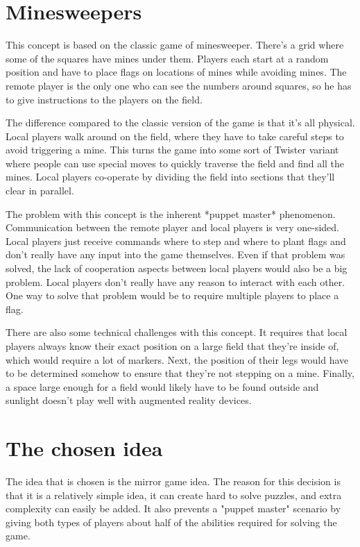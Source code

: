 \section{Minesweepers}
	This concept is based on the classic game of minesweeper. There's a grid
	where some of the squares have mines under them. Players each start at a
	random position and have to place flags on locations of mines while avoiding
	mines. The remote player is the only one who can see the numbers around
	squares, so he has to give instructions to the players on the field.

	The difference compared to the classic version of the game is that it's all
	physical. Local players walk around on the field, where they have to take
	careful steps to avoid triggering a mine. This turns the game into some sort
	of Twister variant where people can use special moves to quickly traverse
	the field and find all the mines. Local players co-operate by dividing the
	field into sections that they'll clear in parallel.

	The problem with this concept is the inherent *puppet master* phenomenon.
	Communication between the remote player and local players is very one-sided.
	Local players just receive commands where to step and where to plant flags
	and don't really have any input into the game themselves. Even if that
	problem was solved, the lack of cooperation aspects between local players
	would also be a big problem. Local players don't really have any reason to
	interact with each other. One way to solve that problem would be to require
	multiple players to place a flag.

	There are also some technical challenges with this concept. It requires that
	local players always know their exact position on a large field that they're
	inside of, which would require a lot of markers. Next, the position of their
	legs would have to be determined somehow to ensure that they're not stepping
	on a mine. Finally, a space large enough for a field would likely have to be
	found outside and sunlight doesn't play well with augmented reality devices.

\section{The chosen idea} \label{sec:chosenidea}
	The idea that is chosen is the mirror game idea. The reason for this
	decision is that it is a relatively simple idea, it can create hard
	to solve puzzles, and extra complexity can easily be added. It also
	prevents a "puppet master" scenario by giving both types of players
	about half of the abilities required for solving the game.

